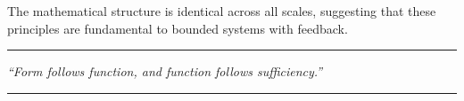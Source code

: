\documentclass[twocolumn,11pt,a4paper]{article}
\begin{document}
The mathematical structure is identical across all scales, suggesting that these principles are fundamental to bounded systems with feedback.

\vspace{1cm}

\begin{center}
\rule{0.5\textwidth}{0.4pt}

\textit{``Form follows function, and function follows sufficiency.''}

\rule{0.5\textwidth}{0.4pt}
\end{center}



\end{document}
